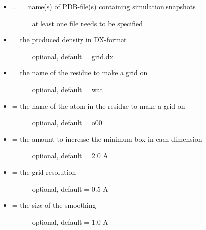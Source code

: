 \documentclass[letterpaper,10pt,english]{sphinxmanual}
\begin{document}
\begin{itemize}
\item {} \begin{description}
\item[{ ... = name(s) of PDB-file(s) containing simulation snapshots}] \leavevmode
at least one file needs to be specified

\end{description}

\item {} \begin{description}
\item[{ = the produced density in DX-format}] \leavevmode
optional, default = grid.dx

\end{description}

\item {} \begin{description}
\item[{ = the name of the residue to make a grid on}] \leavevmode
optional, default = wat

\end{description}

\item {} \begin{description}
\item[{ = the name of the atom in the residue to make a grid on}] \leavevmode
optional, default = o00

\end{description}

\item {} \begin{description}
\item[{ = the amount to increase the minimum box in each dimension}] \leavevmode
optional, default = 2.0 A

\end{description}

\item {} \begin{description}
\item[{ = the grid resolution}] \leavevmode
optional, default = 0.5 A

\end{description}

\item {} \begin{description}
\item[{ = the size of the smoothing}] \leavevmode
optional, default =  1.0 A


\end{description}
\end{itemize}
\end{document}
